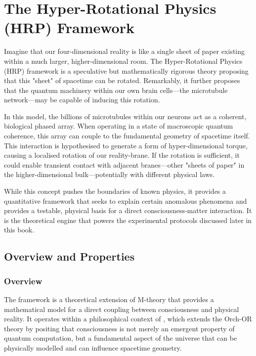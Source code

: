 
\chapter{The Hyper-Rotational Physics (HRP) Framework}
\label{ch:hrp}

\begin{nontechnical}
    Imagine that our four-dimensional reality is like a single sheet of paper existing within a much larger, higher-dimensional room. The Hyper-Rotational Physics (HRP) framework is a speculative but mathematically rigorous theory proposing that this "sheet" of spacetime can be rotated. Remarkably, it further proposes that the quantum machinery within our own brain cells—the microtubule network—may be capable of inducing this rotation.

    In this model, the billions of microtubules within our neurons act as a coherent, biological phased array. When operating in a state of macroscopic quantum coherence, this array can couple to the fundamental geometry of spacetime itself. This interaction is hypothesised to generate a form of hyper-dimensional torque, causing a localised rotation of our reality-brane. If the rotation is sufficient, it could enable transient contact with adjacent branes—other "sheets of paper" in the higher-dimensional bulk—potentially with different physical laws.

    While this concept pushes the boundaries of known physics, it provides a quantitative framework that seeks to explain certain anomalous phenomena and provides a testable, physical basis for a direct consciousness-matter interaction. It is the theoretical engine that powers the experimental protocols discussed later in this book.
\end{nontechnical}

\section{Overview and Properties}

\subsection{Overview}

The  framework is a theoretical extension of M-theory that provides a mathematical model for a direct coupling between consciousness and physical reality. It operates within a philosophical context of , which extends the Orch-OR theory by positing that consciousness is not merely an emergent property of quantum computation, but a fundamental aspect of the universe that can be physically modelled and can influence spacetime geometry.

